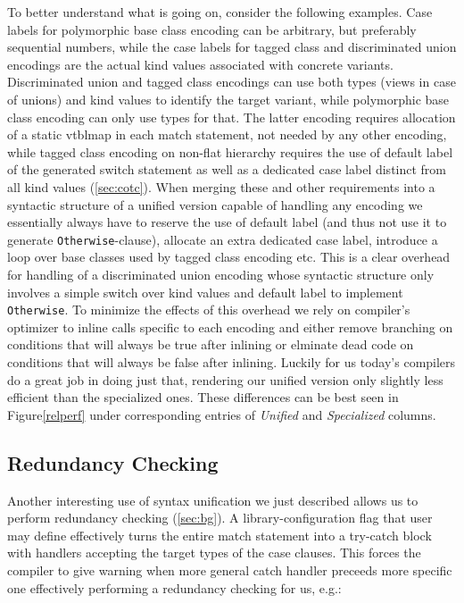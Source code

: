\documentclass[preprint]{sigplanconf}
\makeatletter
\DeclareRobustCommand{\code}[1]{{\lstinline[breaklines=false,escapechar=@]{#1}}}
\makeatother
\begin{document}
To better understand what is going on, consider the following examples. Case 
labels for polymorphic base class encoding can be arbitrary, but preferably 
sequential numbers, while the case labels for tagged class and discriminated 
union encodings are the actual kind values associated with concrete variants.
Discriminated union and tagged class encodings can use both types (views in case
of unions) and kind values to identify the target variant, while polymorphic 
base class encoding can only use types for that. The latter encoding requires 
allocation of a static vtblmap in each match statement, not needed by any other 
encoding, while tagged class encoding on non-flat hierarchy requires the use of 
default label of the generated switch statement as well as a dedicated case 
label distinct from all kind values (\textsection\ref{sec:cotc}). 
When merging these and other requirements into a syntactic structure of a 
unified version capable of handling any encoding we essentially always have to 
reserve the use of default label (and thus not use it to generate 
\code{Otherwise}-clause), allocate an extra dedicated case label, introduce  
a loop over base classes used by tagged class encoding etc. This is a clear 
overhead for handling of a discriminated union encoding whose syntactic 
structure only involves a simple switch over kind values and default label to 
implement \code{Otherwise}. To minimize the effects of this overhead we rely on 
compiler's optimizer to inline calls specific to each encoding and either remove 
branching on conditions that will always be true after inlining or elminate dead 
code on conditions that will always be false after inlining. Luckily for us 
today's compilers do a great job in doing just that, rendering our unified 
version only slightly less efficient than the specialized ones. These 
differences can be best seen in Figure\ref{relperf} under corresponding entries 
of \emph{Unified} and \emph{Specialized} columns.

\subsection{Redundancy Checking}
\label{sec:redun}

Another interesting use of syntax unification we just described allows us to 
perform redundancy checking (\textsection\ref{sec:bg}). A library-configuration 
flag that user may define effectively turns the entire match statement into a 
try-catch block with handlers accepting the target types of the case clauses. 
This forces the compiler to give warning when more general catch handler 
preceeds more specific one effectively performing a redundancy checking for us, 
e.g.:
\end{document}
